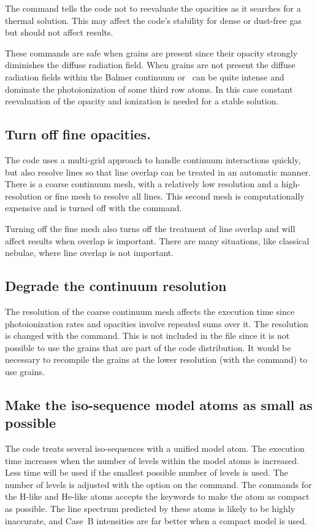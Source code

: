 The  command tells the
code not to reevaluate the opacities as it searches
for a thermal solution.
This may affect the code's stability for dense or
dust-free gas but should not affect results.

These commands are safe when grains are present since their opacity
strongly diminishes the diffuse radiation field.
When grains are not present
the diffuse radiation fields within the Balmer continuum or
\la\ can be quite
intense and dominate the photoionization of some third row atoms.
In this
case constant reevaluation of the opacity and ionization is needed for a
stable solution.

\subsection{Turn off fine opacities.  }

The code uses a multi-grid approach to handle continuum interactions
quickly, but also resolve lines so that line overlap can be treated in an
automatic manner.
There is a coarse continuum mesh, with a relatively low
resolution and a high-resolution or fine mesh to resolve all lines.
This
second mesh is computationally expensive and is turned off with the
 command.

Turning off the fine mesh also turns off the treatment of line overlap
and will affect results when overlap is important.
There are many
situations, like classical nebulae, where line overlap is not important.

\subsection{Degrade the continuum resolution }

The resolution of the coarse continuum mesh affects the execution time
since photoionization rates and opacities involve repeated sums over it.
The resolution is changed with the  command.
This is not included in the  file since it
is not possible to use the grains that are
part of the code distribution.
It would be necessary to recompile the
grains at the lower resolution
(with the  command) to use grains.

\subsection{Make the iso-sequence model atoms as small as possible}

The code treats several iso-sequences with a unified model atom.
The
execution time increases when the number of levels within the model atoms
is increased.
Less time will be used if the smallest possible number of
levels is used.
The number of levels is adjusted with the  option
on the  command.
The
 commands for the
H-like and He-like atoms accepts the keywords 
to make the atom
as compact as possible.
The line spectrum predicted by these atoms is likely
to be highly inaccurate,
and Case~B intensities are far better when a compact model is used.


